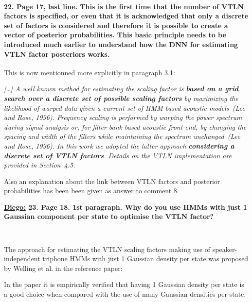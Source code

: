 \documentclass[]{article}
\begin{document}
\paragraph{22. Page 17, last line. This is the first time that the number of VTLN factors is specified, or even that it is acknowledged that only a discrete set of factors is considered and therefore it is possible to create a vector of posterior probabilities. This basic principle needs to be introduced much earlier to understand how the DNN for estimating VTLN factor posteriors works.}

This is now mentionned more explicitly in paragraph 3.1: 

\textit{[\dots] A  well  known  method  for estimating  the scaling  factor is \textbf{ based on  a  grid search  over a  discrete set  of possible scaling  factors} by maximizing the likelihood  of warped data given  a  current set  of  HMM-based acoustic  models~(Lee and Rose, 1996). Frequency scaling  is performed by  warping the power  spectrum during signal  analysis  or, for  filter-bank  based  acoustic front-end,  by changing the  spacing and width  of the filters while  maintaining the spectrum  unchanged~(Lee and Rose, 1996). In  this  work we  adopted  the latter approach \textbf{considering a discrete set of VTLN factors}. Details on the VTLN implementation  are provided in Section~4.5.}

Also an explanation about the link between VTLN factors and posterior probabilities has been been given as answer to comment 8.

\textbf{\underline{Diego:} 23. Page 18. 1st paragraph. Why do you use HMMs with just 1 Gaussian component per state to optimise the VTLN factor? }

~

The   approach  for  estimating   the  VTLN   scaling factors  making   use  of
speaker-independent  triphone  HMMs  with  just 1 Gaussian density  per  state  was
proposed by Welling et al. in the reference paper:
\begin{itemize}
\item L. Welling, S. Kanthak and  H.~Ney, ``Improved Methods for Vocal Tract                                              
Normalization}'', in Proc. of IEEE ICASSP, 1999, Vol. 2, pp. 761-764.
\end{itemize}

In the paper it is empirically verified that having 1 Gaussian density
per state is a good  choice when compared
with the use of many Gaussian densities per state.
\end{document}
